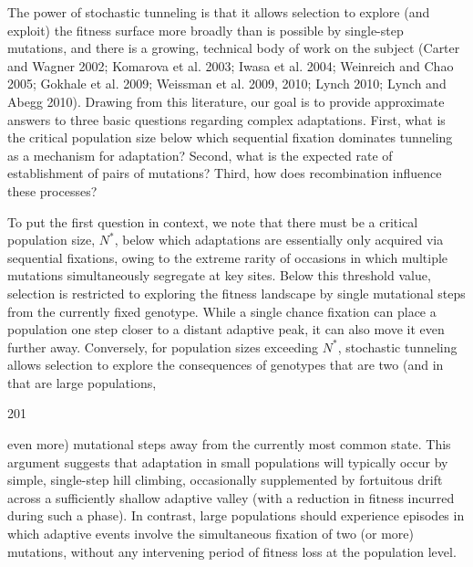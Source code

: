 \documentclass{article}
\begin{document}
The power of stochastic tunneling is that it allows selection to explore (and exploit) the fitness surface more broadly than is possible by single-step mutations, and there is a growing, technical body of work on the subject (Carter and Wagner 2002; Komarova et al. 2003; Iwasa et al. 2004; Weinreich and Chao 2005; Gokhale et al. 2009; Weissman et al. 2009, 2010; Lynch 2010; Lynch and Abegg 2010). Drawing from this literature, our goal is to provide approximate answers to three basic questions regarding complex adaptations. First, what is the critical population size below which sequential fixation dominates tunneling as a mechanism for adaptation? Second, what is the expected rate of establishment of pairs of mutations? Third, how does recombination influence these processes?

To put the first question in context, we note that there must be a critical population size,  $ N^{*} $, below which adaptations are essentially only acquired via sequential fixations, owing to the extreme rarity of occasions in which multiple mutations simultaneously segregate at key sites. Below this threshold value, selection is restricted to exploring the fitness landscape by single mutational steps from the currently fixed genotype. While a single chance fixation can place a population one step closer to a distant adaptive peak, it can also move it even further away. Conversely, for population sizes exceeding  $ N^{*} $, stochastic tunneling allows selection to explore the consequences of genotypes that are two (and in that are large populations,

201

even more) mutational steps away from the currently most common state. This argument suggests that adaptation in small populations will typically occur by simple, single-step hill climbing, occasionally supplemented by fortuitous drift across a sufficiently shallow adaptive valley (with a reduction in fitness incurred during such a phase). In contrast, large populations should experience episodes in which adaptive events involve the simultaneous fixation of two (or more) mutations, without any intervening period of fitness loss at the population level.
\end{document}
